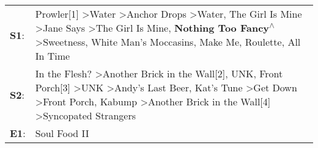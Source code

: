 \begin{supertabular}{p{0.03\textwidth}p{0.92\textwidth}}
 \textbf{S1}:  &  Prowler[1]\textsuperscript{} \textgreater \enspace Water\textsuperscript{} \textgreater \enspace Anchor Drops\textsuperscript{} \textgreater \enspace Water\textsuperscript{}, \enspace The Girl Is Mine\textsuperscript{} \textgreater \enspace Jane Says\textsuperscript{} \textgreater \enspace The Girl Is Mine\textsuperscript{}, \enspace \textbf{Nothing Too Fancy\textsuperscript{$\wedge$}} \textgreater \enspace Sweetness\textsuperscript{}, \enspace White Man's Moccasins\textsuperscript{}, \enspace Make Me\textsuperscript{}, \enspace Roulette\textsuperscript{}, \enspace All In Time\textsuperscript{}  \enspace  \\
 \textbf{S2}:  &                      In the Flesh?\textsuperscript{} \textgreater \enspace Another Brick in the Wall[2]\textsuperscript{}, \enspace UNK\textsuperscript{}, \enspace Front Porch[3]\textsuperscript{} \textgreater \enspace UNK\textsuperscript{} \textgreater \enspace Andy's Last Beer\textsuperscript{}, \enspace Kat's Tune\textsuperscript{} \textgreater \enspace Get Down\textsuperscript{} \textgreater \enspace Front Porch\textsuperscript{}, \enspace Kabump\textsuperscript{} \textgreater \enspace Another Brick in the Wall[4]\textsuperscript{} \textgreater \enspace Syncopated Strangers\textsuperscript{}  \enspace  \\
 \textbf{E1}:  &                                                                                                                                                                                                                                                                                                                                                                                                                                                                                                                                                                                             Soul Food II\textsuperscript{}  \enspace  \\
\end{supertabular}
